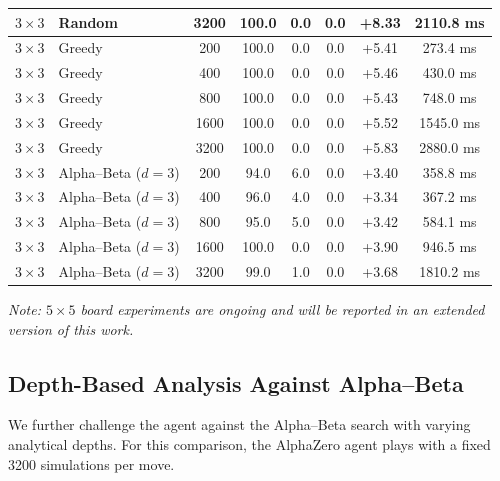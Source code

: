 \documentclass[11pt]{article}
\begin{document}
\begin{table}[H]
\begin{tabular}{llcccccc}
$3{\times}3$ & Random & 3200 & 100.0 & 0.0 & 0.0 & +8.33 & 2110.8 ms \\
\midrule
$3{\times}3$ & Greedy & 200  & 100.0 & 0.0 & 0.0 & +5.41 & 273.4 ms \\
$3{\times}3$ & Greedy & 400  & 100.0 & 0.0 & 0.0 & +5.46 & 430.0 ms \\
$3{\times}3$ & Greedy & 800  & 100.0 & 0.0 & 0.0 & +5.43 & 748.0 ms \\
$3{\times}3$ & Greedy & 1600 & 100.0 & 0.0 & 0.0 & +5.52 & 1545.0 ms \\
$3{\times}3$ & Greedy & 3200 & 100.0 & 0.0 & 0.0 & +5.83 & 2880.0 ms \\
\midrule
$3{\times}3$ & Alpha--Beta ($d{=}3$) & 200  & 94.0 & 6.0 & 0.0 & +3.40 & 358.8 ms \\
$3{\times}3$ & Alpha--Beta ($d{=}3$) & 400  & 96.0 & 4.0 & 0.0 & +3.34 & 367.2 ms \\
$3{\times}3$ & Alpha--Beta ($d{=}3$) & 800  & 95.0 & 5.0 & 0.0 & +3.42 & 584.1 ms \\
$3{\times}3$ & Alpha--Beta ($d{=}3$) & 1600 & 100.0 & 0.0 & 0.0 & +3.90 & 946.5 ms \\
$3{\times}3$ & Alpha--Beta ($d{=}3$) & 3200 & 99.0 & 1.0 & 0.0 & +3.68 & 1810.2 ms \\
\bottomrule
\end{tabular}
\vspace{0.3em}

\noindent\textit{Note: $5{\times}5$ board experiments are ongoing and will be reported in an extended version of this work.}
\end{table}

\subsection{Depth-Based Analysis Against Alpha--Beta}

We further challenge the agent against the Alpha--Beta search with varying analytical depths. For this comparison, the AlphaZero agent plays with a fixed 3200 simulations per move.
\end{document}
